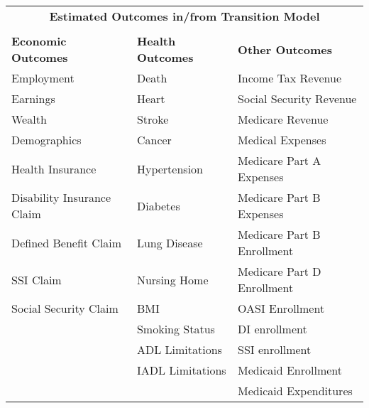 \begin{center}
\begin{tabular}{l l l}
\multicolumn{3}{c}{\textbf{Estimated Outcomes in/from Transition Model}}\\
 & & \\
\textbf{Economic Outcomes} & \textbf{Health Outcomes} & \textbf{Other Outcomes}\\
Employment & Death & Income Tax Revenue\\
Earnings & Heart & Social Security Revenue\\
Wealth & Stroke & Medicare Revenue\\
Demographics & Cancer & Medical Expenses\\
Health Insurance & Hypertension & Medicare Part A Expenses\\
Disability Insurance Claim & Diabetes & Medicare Part B Expenses\\
Defined Benefit Claim & Lung Disease & Medicare Part B Enrollment\\
SSI Claim & Nursing Home &  Medicare Part D Enrollment\\
Social Security Claim & BMI  & OASI Enrollment \\
 & Smoking Status & DI enrollment\\
 & ADL Limitations & SSI enrollment\\
 & IADL Limitations	& Medicaid Enrollment\\
 & & Medicaid Expenditures
\end{tabular}
\end{center}






